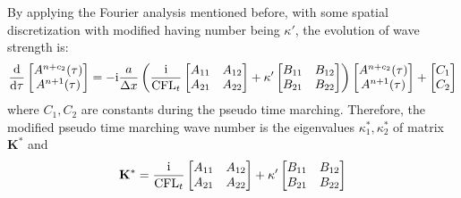 \documentclass[preprint,12pt]{elsarticle}
\begin{document}
By applying the Fourier analysis mentioned before,
with some spatial  discretization with modified having number
being $\kappa'$, the evolution of wave strength is:
\begin{equation}
    \derivative{ }{\tau}
    \begin{bmatrix}
        A^{n+c_2}(\tau) \\
        A^{n+1}(\tau)
    \end{bmatrix}
    =
    -\imagUnit \frac{a}{\inc x}
    \left(\frac{\imagUnit}{\CFLt}\begin{bmatrix}
        A_{11} & A_{12} \\
        A_{21} & A_{22} \\
    \end{bmatrix}
    +\kappa'
    \begin{bmatrix}
        B_{11} & B_{12} \\
        B_{21} & B_{22} \\
    \end{bmatrix}
    \right)
    \begin{bmatrix}
        A^{n+c_2}(\tau) \\
        A^{n+1}(\tau)
    \end{bmatrix}
    +
    \begin{bmatrix}
        C_1 \\C_2
    \end{bmatrix}
\end{equation}
where $C_1,C_2$ are constants during the pseudo time marching.
Therefore, the modified pseudo time marching wave number is
the eigenvalues $\kappa^*_1,\kappa^*_2$ of matrix $\mathbf{K}^*$ and
\begin{equation}
    \mathbf{K}^* = \frac{\mathrm{i}}{\text{CFL}_t}\begin{bmatrix}
        A_{11} & A_{12} \\
        A_{21} & A_{22} \\
    \end{bmatrix}
    +\kappa'
    \begin{bmatrix}
        B_{11} & B_{12} \\
        B_{21} & B_{22} \\
    \end{bmatrix}
\end{equation}
\end{document}
